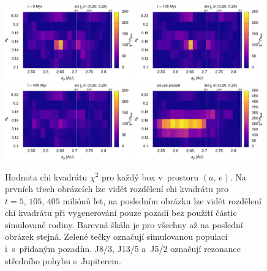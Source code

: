 \documentclass{beamer}
\newlength{\vyska}
\newlength{\vyskaB}
\newlength{\main}
\begin{document}
\begin{frame}
\begin{columns}[t]
\begin{column}{\main}
\begin{tcolorbox}[title=Výsledky\phantom{Úy},height=\vyskaB]
		\begin{figure}
			\centering
			\includegraphics[width=0.49\textwidth]{../obr/ae_chi_0006t.png}
			\includegraphics[width=0.49\textwidth]{../obr/ae_chi_0106t.png}\\
			\includegraphics[width=0.49\textwidth]{../obr/ae_chi_0406t.png}
			\includegraphics[width=0.49\textwidth]{../obr/ae_chi_emptyt.png}
			\caption{Hodnota chi kvadrátu $\chi^2$ pro každý box v~prostoru $(a,\,e)$. Na prvních třech obrázcích lze vidět rozdělení chi kvadrátu pro $t=5,\,105,\,405$ miliónů let, na posledním obrázku lze vidět rozdělení chi kvadrátu při vygenerování pouze pozadí bez použití částic simulované rodiny. Barevná škála je pro všechny až na poslední obrázek stejná. Zelené tečky označují simulovanou populaci i~s~přidaným pozadím. J8/3, J13/5 a~J5/2 označují rezonance středního pohybu s~Jupiterem.} \label{fig:ae_chi2}
		\end{figure}


\end{tcolorbox}
\end{column}
\end{columns}
\end{frame}
\end{document}

